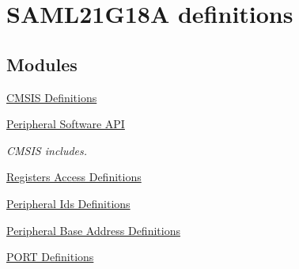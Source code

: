 \hypertarget{group___s_a_m_l21_g18_a__definitions}{}\section{S\+A\+M\+L21\+G18\+A definitions}
\label{group___s_a_m_l21_g18_a__definitions}
\subsection*{Modules}
\begin{DoxyCompactItemize}
\item 
\hyperlink{group___s_a_m_l21_g18_a__cmsis}{C\+M\+S\+I\+S Definitions}
\item 
\hyperlink{group___s_a_m_l21_g18_a__api}{Peripheral Software A\+P\+I}
\begin{DoxyCompactList}\small\item\em C\+M\+S\+I\+S includes. \end{DoxyCompactList}\item 
\hyperlink{group___s_a_m_l21_g18_a__reg}{Registers Access Definitions}
\item 
\hyperlink{group___s_a_m_l21_g18_a__id}{Peripheral Ids Definitions}
\item 
\hyperlink{group___s_a_m_l21_g18_a__base}{Peripheral Base Address Definitions}
\item 
\hyperlink{group___s_a_m_l21_g18_a__port}{P\+O\+R\+T Definitions}
\end{DoxyCompactItemize}
